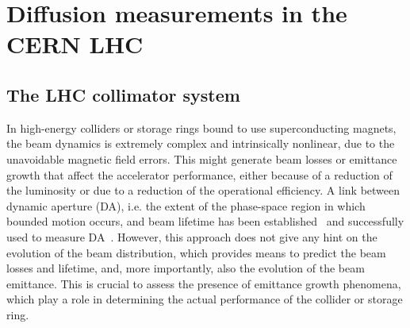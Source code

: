 \chapter{Diffusion measurements in the CERN LHC}

\section{The LHC collimator system}


In high-energy colliders or storage rings bound to use superconducting magnets, the beam dynamics is extremely complex and intrinsically nonlinear, due to the unavoidable magnetic field errors. This might generate beam losses or emittance growth that affect the accelerator performance, either because of a reduction of the luminosity or due to a reduction of the operational efficiency. A link between dynamic aperture (DA), i.e. the extent of the phase-space region in which bounded motion occurs, and beam lifetime has been established~\cite{PhysRevSTAB.15.024001} and successfully used to measure DA~\cite{PhysRevAccelBeams.22.034002}. However, this approach does not give any hint on the evolution of the beam distribution, which provides means to predict the beam losses and lifetime, and, more importantly, also the evolution of the beam emittance. This is crucial to assess the presence of emittance growth phenomena, which play a role in determining the actual performance of the collider or storage ring. 


